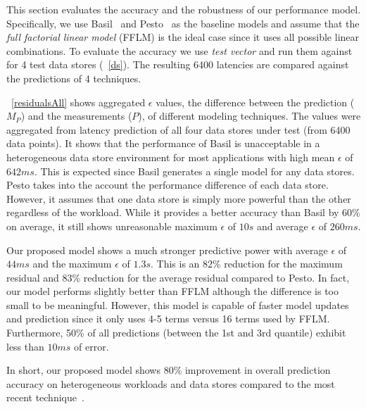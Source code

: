 This section evaluates the accuracy and the robustness of our performance model.
Specifically, we use Basil~\cite{gulati:2010} and Pesto~\cite{gulati:2011} as the baseline models and assume that the \emph{full factorial linear model} (FFLM) is the ideal case since it uses all possible linear combinations.
To evaluate the accuracy we use \emph{test vector} and run them against for 4 test data stores (\tablename~\ref{ds}).
The resulting 6400 latencies are compared against the predictions of 4 techniques.

\tablename~\ref{residualsAll} shows aggregated $\epsilon$ values, the difference between the prediction ($M_P$) and the measurements ($P$), of different modeling techniques.
The values were aggregated from latency prediction of all four data stores under test (from 6400 data points).
It shows that the performance of Basil is unacceptable in a heterogeneous data store environment for most applications with high mean $\epsilon$ of $642\mathit{ms}$.
This is expected since Basil generates a single model for any data stores.
Pesto takes into the account the performance difference of each data store.
However, it assumes that one data store is simply more powerful than the other regardless of the workload.
While it provides a better accuracy than Basil by 60\% on average, it still shows unreasonable maximum $\epsilon$ of $10s$ and average $\epsilon$ of $260\mathit{ms}$.

Our proposed model shows a much stronger predictive power with average $\epsilon$ of $44\mathit{ms}$ and the maximum $\epsilon$ of $1.3s$.
This is an 82\% reduction for the maximum residual and 83\% reduction for the average residual compared to Pesto.
In fact, our model performs slightly better than FFLM although the difference is too small to be meaningful.
However, this model is capable of faster model updates and prediction since it only uses 4-5 terms versus 16 terms used by FFLM.
Furthermore, 50\% of all predictions (between the 1st and 3rd quantile) exhibit less than $10\mathit{ms}$ of error.

In short, our proposed model shows 80\% improvement in overall prediction accuracy on heterogeneous workloads and data stores compared to the most recent technique~\cite{gulati:2011}.

